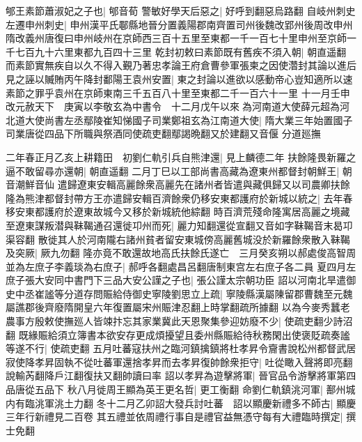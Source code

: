 郇王素節蕭淑妃之子也|{
	郇音荀}
警敏好學天后惡之|{
	好呼到翻惡烏路翻}
自岐州刺史左遷申州刺史|{
	申州漢平氏鄳縣地晉分置義陽郡南齊置司州後魏改郢州後周改申州隋改義州唐復曰申州岐州在京師西三百十五里至東都一千一百七十里申州至京師一千七百九十六里東都九百四十三里}
乾封初敕曰素節既有舊疾不須入朝|{
	朝直遥翻}
而素節實無疾自以久不得入覲乃著忠孝論王府倉曹參軍張柬之因使濳封其論以進后見之誣以贓賄丙午降封鄱陽王袁州安置|{
	東之封論以進欲以感動帝心豈知適所以速素節之罪乎袁州在京師東南三千五百八十里至東都二千一百六十一里}
十一月壬申改元赦天下　庚寅以李敬玄為中書令　十二月戊午以來為河南道大使薛元超為河北道大使尚書左丞鄢陵崔知悌國子司業鄭祖玄為江南道大使|{
	隋大業三年始置國子司業唐從四品下所職與祭酒同使疏吏翻鄢謁晩翻又於建翻又音偃}
分道廵撫

二年春正月乙亥上耕籍田　初劉仁軌引兵自熊津還|{
	見上麟德二年}
扶餘隆畏新羅之逼不敢留尋亦還朝|{
	朝直遥翻}
二月丁巳以工部尚書高藏為遼東州都督封朝鮮王|{
	朝音潮鮮音仙}
遣歸遼東安輯高麗餘衆高麗先在諸州者皆遣與藏俱歸又以司農卿扶餘隆為熊津都督封帶方王亦遣歸安輯百濟餘衆仍移安東都護府於新城以統之|{
	去年春移安東都護府於遼東故城今又移於新城統他綜翻}
時百濟荒殘命隆寓居高麗之境藏至遼東謀叛潜與靺鞨通召還徙卭州而死|{
	麗力知翻還從宣翻又音如字靺鞨音末曷卭渠容翻}
散徙其人於河南隴右諸州貧者留安東城傍高麗舊城没於新羅餘衆散入靺鞨及突厥|{
	厥九勿翻}
隆亦竟不敢還故地高氏扶餘氏遂亡　三月癸亥朔以郝處俊高智周並為左庶子李義琰為右庶子|{
	郝呼各翻處昌呂翻唐制東宫左右庶子各二員}
夏四月左庶子張大安同中書門下三品大安公謹之子也|{
	張公謹太宗朝功臣}
詔以河南北旱遣御史中丞崔謐等分道存問賑給侍御史寧陵劉思立上疏|{
	寧陵縣漢屬陳留郡曹魏至元魏屬譙郡後齊廢隋開皇六年復置屬宋州賑津忍翻上時掌翻疏所據翻}
以為今麥秀蠶老農事方殷敕使撫廵人皆竦抃忘其家業冀此天恩聚集參迎妨廢不少|{
	使疏吏翻少詩沼翻}
既緣賑給須立簿書本欲安存更成煩擾望且委州縣賑給待秋務閑出使褒貶疏奏謐等遂不行|{
	使疏吏翻}
五月吐蕃寇扶州之臨河鎮擒鎮將杜孝昇令齎書說松州都督武居寂使降孝昇固執不從吐蕃軍還捨孝昇而去孝昇復帥餘衆拒守|{
	吐從瞰入聲將即亮翻說輸芮翻降戶江翻復扶又翻帥讀曰率}
詔以孝昇為遊擊將軍|{
	晉官品令游擊將軍第四品唐從五品下}
秋八月徙周王顯為英王更名哲|{
	更工衡翻}
命劉仁軌鎮洮河軍|{
	鄯州城内有臨洮軍洮土力翻}
冬十二月乙卯詔大發兵討吐蕃　詔以顯慶新禮多不師古|{
	顯慶三年行新禮見二百卷}
其五禮並依周禮行事自是禮官益無憑守每有大禮臨時撰定|{
	撰士免翻}


